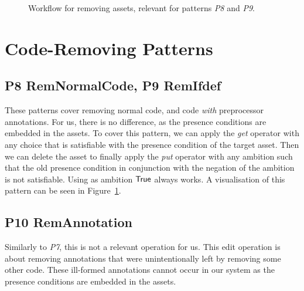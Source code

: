 \begin{figure}
  \centering
  \caption{Workflow for removing assets, relevant for patterns \emph{P8} and \emph{P9}.}
  \label{fig:patterns:p8}
\end{figure}

\section{Code-Removing Patterns}
\subsection*{P8 RemNormalCode, P9 RemIfdef}
These patterns cover removing normal code, and code \emph{with} preprocessor
annotations. For us, there is no difference, as the presence conditions are
embedded in the assets. To cover this pattern, we can apply the
\emph{get} operator with any choice that is satisfiable with the presence
condition of the target asset. Then we can delete the asset to finally apply
the \emph{put} operator with any ambition such that the old presence condition
in conjunction with the negation of the ambition is not satisfiable. Using as
ambition \({\sf True}\) always works. A visualisation of this pattern can be
seen in Figure~\ref{fig:patterns:p8}.

\subsection*{P10 RemAnnotation}
Similarly to \emph{P7}, this is not a relevant operation for us. This edit
operation is about removing annotations that were unintentionally left by
removing some other code. These ill-formed annotations cannot occur in our
system as the presence conditions are embedded in the assets.

